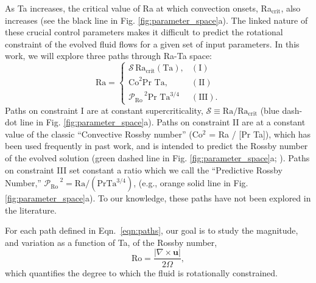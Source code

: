 \documentclass[twocolumn, amsmath, amsfonts, amssymb]{aastex62}
\newcommand{\grad}{\ensuremath{\nabla}}
\newcommand{\pro}{\ensuremath{\mathcal{P}_{\text{Ro}}\,}}
\begin{document}
As Ta increases, the critical value of Ra at which convection onsets,
Ra$_{\text{crit}}$, also increases (see the black line in Fig. \ref{fig:parameter_space}a). 
The linked nature of these crucial
control parameters makes it difficult to predict the rotational constraint of the evolved
fluid flows for a given set of input parameters. In this work, we will
explore three paths through Ra-Ta space:
\begin{equation}
    \text{Ra} = 
    \begin{cases}
    \mathcal{S}\,\text{Ra}_\text{crit}(\text{Ta}), & (\text{I})\\
    \text{Co}^2\text{Pr Ta}, & (\text{II}) \\
    \pro^2 \text{Pr Ta}^{3/4} & (\text{III}).
    \end{cases}
    \label{eqn:paths}
\end{equation}
Paths on constraint I are at constant supercriticality, 
$\mathcal{S} \equiv \text{Ra}/\text{Ra}_{\text{crit}}$
(blue dash-dot line in Fig. \ref{fig:parameter_space}a).
Paths on constraint II are at a constant value of the classic
``Convective Rossby number'' (Co$^2$ = Ra / [Pr Ta]), which has been used frequently 
in past work, and is intended to predict the Rossby number of the
evolved solution (green dashed line in Fig. \ref{fig:parameter_space}a; 
\citet{julien&all1996, brummell&all1996}). Paths on constraint
III set constant a ratio which we call the ``Predictive Rossby Number,'' 
$\pro^2 = \text{Ra}/(\text{Pr}\text{Ta}^{3/4})$, 
(e.g., orange solid line in Fig. \ref{fig:parameter_space}a).
To our knowledge, these paths have not been explored
in the literature.



For each path defined in Eqn.~\ref{eqn:paths}, 
our goal is to study the magnitude, and variation as
a function of Ta, of the Rossby number,
\begin{equation}
    \text{Ro} = \frac{|\grad\times \bm{u}|}{2 \Omega},
    \label{eqn:ro}
\end{equation}
which quantifies the degree to which the fluid is rotationally constrained.


\end{document}
